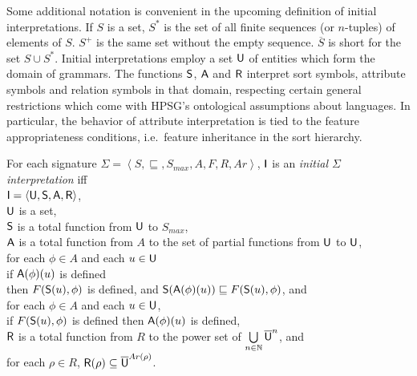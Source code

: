 \documentclass[output=paper
                ,modfonts
                ,nonflat
	        ,collection
	        ,collectionchapter
	        ,collectiontoclongg
 	        ,biblatex
                ,babelshorthands
                ,newtxmath
                ,draftmode
                ,colorlinks, citecolor=brown
]{./langsci/langscibook}
\begin{document}
{{Some additional notation is convenient in the upcoming definition of
initial interpretations. If $S$ is a
set, $S^{*}$ is the set of all finite sequences (or $n$-tuples) of elements
of $S$. $S^{+}$ is the same set without the empty sequence. $\overline{S}$
is short for the set $S\cup S^{*}$. Initial interpretations employ a set
$\mathsf{U}$ of entities which form the domain of grammars. The functions
$\mathsf{S}$, $\mathsf{A}$ and $\mathsf{R}$ interpret sort symbols, attribute symbols
and relation symbols in that domain, respecting certain general restrictions which come with
HPSG's ontological assumptions about languages. In particular, the behavior of
attribute interpretation is tied to the feature appropriateness conditions,
i.e.\ feature inheritance in the sort hierarchy.

\begin{mydef}\label{def-initial-int}
  For each signature $\Sigma=\left<S,\sqsubseteq,S_{max},A,F,R,Ar\right>$,
  $\mathsf{I}$ is an \emph{initial $\Sigma$ interpretation} iff\\
  $\mathsf{I} = \langle\mathsf{U},\mathsf{S},\mathsf{A},\mathsf{R}\rangle$,\\
  $\mathsf{U}$ is a set,\\
  $\mathsf{S}$ is a total function from $\mathsf{U}$ to $S_{max}$,\\
  $\mathsf{A}$ is a total function from $A$ to the set of partial functions from
  $\mathsf{U}$ to $\mathsf{U}$,\\
  for each $\phi\in A$ and each $u\in\mathsf{U}$\\
  \hspace*{.5cm} if $\mathsf{A}(\phi)(u)$ is defined\\
  \hspace*{.5cm} then $F(\mathsf{S}(u),\phi)$ is defined, and
  $\mathsf{S}(\mathsf{A}(\phi)(u))\sqsubseteq F(\mathsf{S}(u),\phi)$, and\\
  for each $\phi\in A$ and each $u\in\mathsf{U}$,\\
  \hspace*{.5cm} if $F(\mathsf{S}(u),\phi)$ is defined
  then $\mathsf{A}(\phi)(u)$ is defined,\\
  $\mathsf{R}$ is a total function from $R$ to the power set of
  $\bigcup\limits_{n\in\mathbb{N}}{\overline{\mathsf{U}}}^n$, and\\
  \hspace*{.5cm} for each $\rho\in R$,
  $\mathsf{R}(\rho)\subseteq\overline{\mathsf{U}}^{Ar(\rho)}$.
\end{mydef}

}}
\end{document}
